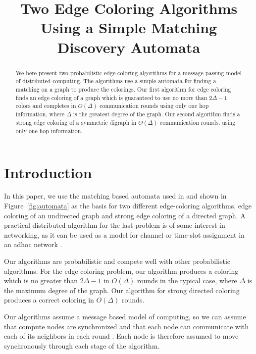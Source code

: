 \documentclass[conference, 10pt, letter]{IEEEtran}
\begin{document}
\title{Two Edge Coloring Algorithms Using a Simple Matching Discovery Automata}

\author{
}

\maketitle

\begin{abstract}
We here present two probabilistic edge coloring algorithms for a message passing model of distributed computing. The algorithms use a simple automata for finding a matching on a graph to produce the colorings. Our first algorithm for edge coloring finds an edge coloring of a graph which is guaranteed to use no more than $2\Delta - 1$ colors and completes in $O(\Delta)$ communication rounds using only one hop information, where $\Delta$ is the greatest degree of the graph. Our second algorithm finds a strong edge coloring of a symmetric digraph in $O(\Delta)$ communication rounds, using only one hop information. 
\end{abstract}

\section{Introduction}
In this paper, we use the matching based automata used in \cite{Daigle:2011uq} and shown in Figure~\ref{fig:automata} as the basis for two different edge-coloring algorithms, edge coloring of an undirected graph and strong edge coloring of a directed graph. A practical distributed algorithm for the last problem is of some interest in networking, as it can be used as a model for channel or time-slot assignment in an adhoc network \cite{1598948, 1498534}.

Our algorithms are probabilistic and compete well with other probabilistic algorithms. For the edge coloring problem, our algorithm produces a coloring which is no greater than $2\Delta - 1$ in $O(\Delta)$ rounds in the typical case, where $\Delta$ is the maximum degree of the graph. Our algorithm for strong directed coloring produces a correct coloring in $O(\Delta)$ rounds. 

 
Our algorithms assume a message based model of computing, so we can assume that compute nodes are synchronized and that each node can communicate with each of its neighbors in each round \cite{1146387}. Each node is therefore assumed to move synchronously through each stage of the algorithm. 
\end{document}
